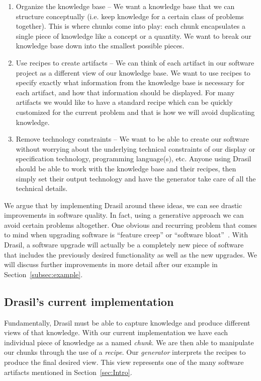 \documentclass[preprint, 10pt]{sigplanconf}
\begin{document}
\begin{enumerate}
\item Organize the knowledge base -- We want a knowledge base that we can
structure conceptually (i.e. keep knowledge for a certain class of problems
together). This is where chunks come into play: each chunk encapsulates a single
piece of knowledge like a concept or a quantity. We want to break our knowledge
base down into the smallest possible pieces.

\item Use recipes to create artifacts -- We can think of each artifact in our
software project as a different view of our knowledge base. We want to use
recipes to specify exactly what information from the knowledge base is necessary
for each artifact, and how that information should be displayed. For many
artifacts we would like to have a standard recipe which can be quickly
customized for the current problem and that is how we will avoid duplicating
knowledge.

\item Remove technology constraints -- We want to be able to create our software
without worrying about the underlying technical constraints of our display or
specification technology, programming language(s), etc. Anyone using Drasil
should be able to work with the knowledge base and their recipes, then simply
set their output technology and have the generator take care of all the
technical details.
\end{enumerate}

We argue that by implementing Drasil around these ideas, we can see drastic
improvements in software quality. In fact, using a generative approach we can
avoid certain problems altogether. One obvious and recurring problem that comes
to mind when upgrading software is ``feature creep'' or ``software
bloat''~\cite{AmselEtAl2011}. With Drasil, a software upgrade will actually be a
completely new piece of software that includes the previously desired
functionality as well as the new upgrades. We will discuss further improvements
in more detail after our example in Section~\ref{subsec:example}.

\subsection{Drasil's current implementation}
\label{subsec:current}

Fundamentally, Drasil must be able to capture knowledge and produce different
views of that knowledge. With our current implementation we have each individual
piece of knowledge as a named \emph{chunk}. We are then able to manipulate our
chunks through the use of a \emph{recipe}. Our \emph{generator} interprets the
recipes to produce the final desired view. This view represents one of the many
software artifacts mentioned in Section~\ref{sec:Intro}.
\end{document}
